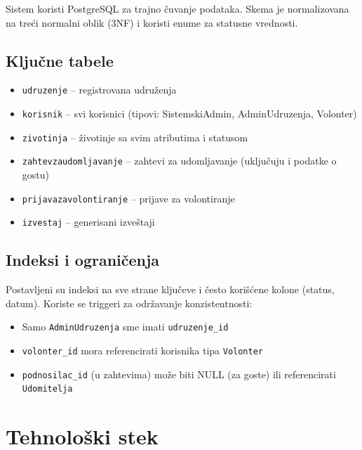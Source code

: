 Sistem koristi PostgreSQL za trajno čuvanje podataka. Skema je normalizovana na treći normalni oblik (3NF) i koristi enume za statusne vrednosti.

\subsection{Ključne tabele}

\begin{itemize}
    \item \texttt{udruzenje} – registrovana udruženja
    \item \texttt{korisnik} – svi korisnici (tipovi: SistemskiAdmin, AdminUdruzenja, Volonter)
    \item \texttt{zivotinja} – životinje sa svim atributima i statusom
    \item \texttt{zahtevzaudomljavanje} – zahtevi za udomljavanje (uključuju i podatke o gostu)
    \item \texttt{prijavazavolontiranje} – prijave za volontiranje
    \item \texttt{izvestaj} – generisani izveštaji
\end{itemize}

\subsection{Indeksi i ograničenja}

Postavljeni su indeksi na sve strane ključeve i često korišćene kolone (status, datum). Koriste se triggeri za održavanje konzistentnosti:
\begin{itemize}
    \item Samo \texttt{AdminUdruzenja} sme imati \texttt{udruzenje\_id}
    \item \texttt{volonter\_id} mora referencirati korisnika tipa \texttt{Volonter}
    \item \texttt{podnosilac\_id} (u zahtevima) može biti NULL (za goste) ili referencirati \texttt{Udomitelja}
\end{itemize}

\section{Tehnološki stek}

